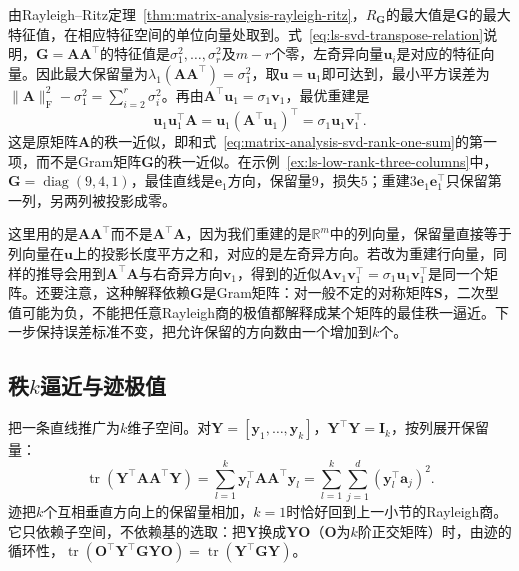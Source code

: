 由Rayleigh--Ritz定理~\ref{thm:matrix-analysis-rayleigh-ritz}，$R_{\bm G}$的最大值是$\bm G$的最大特征值，在相应特征空间的单位向量处取到。式~\eqref{eq:ls-svd-transpose-relation}说明，$\bm G=\bm A\bm A^\top$的特征值是$\sigma_1^2,\ldots,\sigma_r^2$及$m-r$个零，左奇异向量$\bm u_i$是对应的特征向量。因此最大保留量为$\lambda_1(\bm A\bm A^\top)=\sigma_1^2$，取$\bm u=\bm u_1$即可达到，最小平方误差为$\lVert\bm A\rVert_{\mathrm F}^2-\sigma_1^2=\sum_{i=2}^r\sigma_i^2$。再由$\bm A^\top\bm u_1=\sigma_1\bm v_1$，最优重建是
\[
 \bm u_1\bm u_1^\top\bm A=\bm u_1(\bm A^\top\bm u_1)^\top=\sigma_1\bm u_1\bm v_1^\top .
\]
这是原矩阵$\bm A$的秩一近似，即和式~\eqref{eq:matrix-analysis-svd-rank-one-sum}的第一项，而不是Gram矩阵$\bm G$的秩一近似。在示例~\ref{ex:ls-low-rank-three-columns}中，$\bm G=\operatorname{diag}(9,4,1)$，最佳直线是$\bm e_1$方向，保留量$9$，损失$5$；重建$3\bm e_1\bm e_1^\top$只保留第一列，另两列被投影成零。

这里用的是$\bm A\bm A^\top$而不是$\bm A^\top\bm A$，因为我们重建的是$\mathbb R^m$中的列向量，保留量直接等于列向量在$\bm u$上的投影长度平方之和，对应的是左奇异方向。若改为重建行向量，同样的推导会用到$\bm A^\top\bm A$与右奇异方向$\bm v_1$，得到的近似$\bm A\bm v_1\bm v_1^\top=\sigma_1\bm u_1\bm v_1^\top$是同一个矩阵。还要注意，这种解释依赖$\bm G$是Gram矩阵：对一般不定的对称矩阵$\bm S$，二次型值可能为负，不能把任意Rayleigh商的极值都解释成某个矩阵的最佳秩一逼近。下一步保持误差标准不变，把允许保留的方向数由一个增加到$k$个。

\subsection{秩\texorpdfstring{$k$}{k}逼近与迹极值}
\label{sec:ls-rank-k-trace}

把一条直线推广为$k$维子空间。对$\bm Y=[\bm y_1,\ldots,\bm y_k]$，$\bm Y^\top\bm Y=\bm I_k$，按列展开保留量：
\[
 \operatorname{tr}(\bm Y^\top\bm A\bm A^\top\bm Y)
 =\sum_{l=1}^k\bm y_l^\top\bm A\bm A^\top\bm y_l
 =\sum_{l=1}^k\sum_{j=1}^d(\bm y_l^\top\bm a_j)^2 .
\]
迹把$k$个互相垂直方向上的保留量相加，$k=1$时恰好回到上一小节的Rayleigh商。它只依赖子空间，不依赖基的选取：把$\bm Y$换成$\bm Y\bm O$（$\bm O$为$k$阶正交矩阵）时，由迹的循环性，$\operatorname{tr}(\bm O^\top\bm Y^\top\bm G\bm Y\bm O)=\operatorname{tr}(\bm Y^\top\bm G\bm Y)$。

